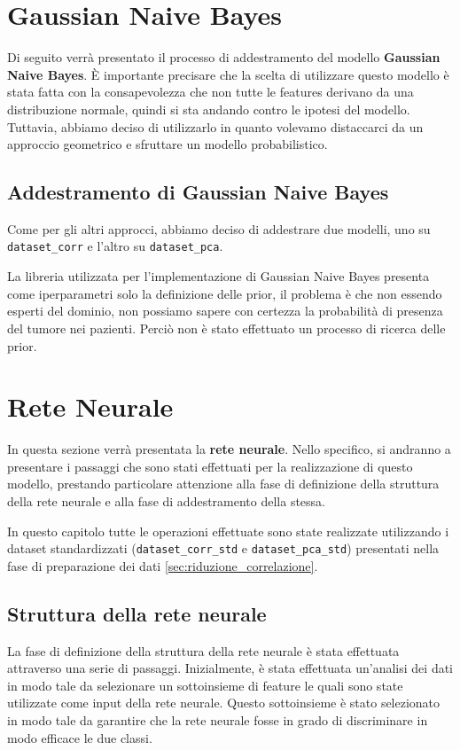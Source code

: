 \newpage

\section{Gaussian Naive Bayes}
Di seguito verrà presentato il processo di addestramento del modello
\textbf{Gaussian Naive Bayes}. È importante precisare che la scelta di utilizzare
questo modello è stata fatta con la consapevolezza che non tutte le features
derivano da una distribuzione normale, quindi si sta andando contro le ipotesi 
del modello.
Tuttavia, abbiamo deciso di utilizzarlo in quanto volevamo distaccarci da un
approccio geometrico e sfruttare un modello probabilistico.
\subsection{Addestramento di Gaussian Naive Bayes}
Come per gli altri approcci, abbiamo deciso di addestrare due modelli, uno su
\texttt{dataset\_corr} e l'altro su \texttt{dataset\_pca}.

La libreria utilizzata per l'implementazione di Gaussian Naive Bayes
presenta come iperparametri solo la definizione delle prior, il problema è che non
essendo esperti del dominio, non possiamo sapere con certezza la probabilità
di presenza del tumore nei pazienti. Perciò non è stato effettuato un processo di
ricerca delle prior.
\section{Rete Neurale}
In questa sezione verrà presentata la \textbf{rete neurale}. Nello specifico, si
andranno a presentare i passaggi che sono stati effettuati per la realizzazione
di questo modello, prestando particolare attenzione alla fase di definizione
della struttura della rete neurale e alla fase di addestramento della stessa.

In questo capitolo tutte le operazioni effettuate sono state realizzate
utilizzando i dataset standardizzati (\texttt{dataset\_corr\_std} e
\texttt{dataset\_pca\_std}) presentati nella fase di preparazione dei
dati \ref{sec:riduzione_correlazione}.
\subsection{Struttura della rete neurale}
La fase di definizione della struttura della rete neurale è stata effettuata
attraverso una serie di passaggi. Inizialmente, è stata effettuata un'analisi
dei dati in modo tale da selezionare un sottoinsieme di feature le quali sono
state utilizzate come input della rete neurale. Questo sottoinsieme è stato
selezionato in modo tale da garantire che la rete neurale fosse in grado di
discriminare in modo efficace le due classi.

